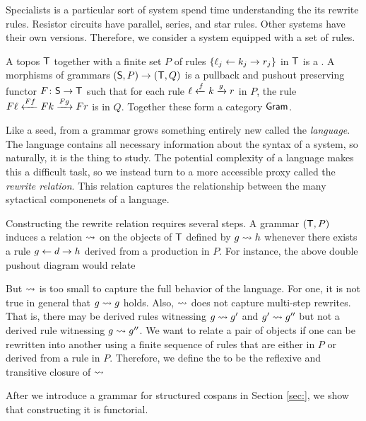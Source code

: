 \documentclass{amsart}
\begin{document}
Specialists is a particular sort of system spend time
understanding the its rewrite rules. Resistor circuits have
parallel, series, and star rules. Other systems have their
own versions. Therefore, we consider a system equipped with
a set of rules. 

\begin{definition}[Grammar] \label{def:grammar} A topos
  $ \mathsf{T} $ together with a finite set $ P $ of rules
  $ \{ \ell_j \leftarrow k_j \to r_j \} $ in $ \mathsf{T} $ is a
  . A morphisms of grammars
  $ ( \mathsf{S} , P ) \to ( \mathsf{T} , Q ) $ is a pullback and pushout
  preserving functor $ F \colon \mathsf{S} \to \mathsf{T} $ such that for
  each rule $ \ell \xleftarrow{f} k \xrightarrow{g} r $ in $ P $, the rule
  $ F\ell \xleftarrow{Ff} Fk \xrightarrow{Fg} Fr $ is in $ Q $. Together
  these form a category $ \mathsf{Gram} $.
\end{definition}

Like a seed, from a grammar grows something entirely new
called the \emph{language}. The language contains all necessary
information about the syntax of a system, so naturally, it
is the thing to study. The potential complexity of a
language makes this a difficult task, so we instead turn to
a more accessible proxy called the \emph{rewrite
  relation}. This relation captures the relationship between
the many sytactical componenets of a language.  

Constructing the rewrite relation requires several steps.  A
grammar $ ( \mathsf{T} , P ) $ induces a relation
$ \rightsquigarrow $ on the objects of $ \mathsf{T} $ defined by
$ g \rightsquigarrow h $ whenever there exists a rule
$ g \leftarrow d \to h $ derived from a production in $ P $. For
instance, the above double pushout diagram would relate


But $ \rightsquigarrow $ is too small to capture the full
behavior of the language.  For one, it is not true in
general that $ g \rightsquigarrow g $ holds. Also, $ \rightsquigarrow $
does not capture multi-step rewrites. That is, there may be
derived rules witnessing $ g \rightsquigarrow g' $ and
$ g' \rightsquigarrow g'' $ but not a derived rule witnessing
$ g \rightsquigarrow g'' $. We want to relate a pair of objects if
one can be rewritten into another using a finite sequence of
rules that are either in $ P $ or derived from a rule in
$ P $. Therefore, we define the  to be
the reflexive and transitive closure of $ \rightsquigarrow $

After we introduce a grammar for structured cospans in Section
\ref{sec:}, we show that constructing it is functorial.
\end{document}
